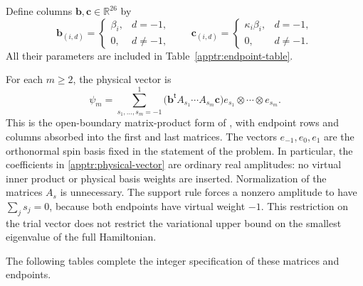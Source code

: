 Define columns $\mathbf b,\mathbf c\in\mathbb R^{26}$ by
\begin{equation}\label{apptr:endpoints}
 \mathbf b_{(i,d)}=\begin{cases}\beta_i,&d=-1,\\0,&d\ne-1,\end{cases}
 \qquad
 \mathbf c_{(i,d)}=\begin{cases}\kappa_i\beta_i,&d=-1,\\0,&d\ne-1.\end{cases}
\end{equation}
All their parameters are included in Table~\ref{apptr:endpoint-table}.

For each $m\ge2$, the physical vector is
\begin{equation}\label{apptr:physical-vector}
 \psi_m=\sum_{s_1,\ldots,s_m=-1}^{1}
 \bigl(\mathbf b^{\mathsf t}A_{s_1}\cdots A_{s_m}\mathbf c\bigr)
 e_{s_1}\otimes\cdots\otimes e_{s_m}.
\end{equation}
This is the open-boundary matrix-product form of
\cite[Section 3.1, Equation (11)]{PerezGarcia2007}, with endpoint rows
and columns absorbed into the first and last matrices.
The vectors $e_{-1},e_0,e_1$ are the orthonormal spin basis fixed in
the statement of the problem.  In particular, the coefficients in
\eqref{apptr:physical-vector} are ordinary real amplitudes: no virtual
inner product or physical basis weights are inserted.  Normalization
of the matrices $A_s$ is unnecessary.  The support rule forces a
nonzero amplitude to have $\sum_j s_j=0$, because both endpoints have
virtual weight $-1$.  This restriction on the trial vector does not
restrict the variational upper bound on the smallest eigenvalue of
the full Hamiltonian.

The following tables complete the integer specification of these matrices
and endpoints.

